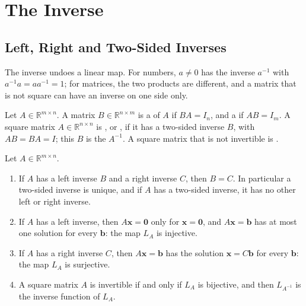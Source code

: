 \section{The Inverse}
\label{sec:inverse}

\subsection{Left, Right and Two-Sided Inverses}

The inverse undoes a linear map. For numbers, $a\ne0$ has the inverse $a^{-1}$ with $a^{-1}a=aa^{-1}=1$; for matrices, the two products are different, and a matrix that is not square can have an inverse on one side only.

\begin{definition}[Inverses]
\label{def:matrix-inverse}
Let $A\in\mathbb R^{m\times n}$. A matrix $B\in\mathbb R^{n\times m}$ is a  of $A$ if $BA=I_n$, and a  if $AB=I_m$. A square matrix $A\in\mathbb R^{n\times n}$ is , or , if it has a two-sided inverse $B$, with $AB=BA=I$; this $B$ is the  $A^{-1}$. A square matrix that is not invertible is .
\end{definition}

\begin{proposition}
\label{prop:one-sided-inverses}
Let $A\in\mathbb R^{m\times n}$.
\begin{enumerate}
\item If $A$ has a left inverse $B$ and a right inverse $C$, then $B=C$. In particular a two-sided inverse is unique, and if $A$ has a two-sided inverse, it has no other left or right inverse.
\item If $A$ has a left inverse, then $A\mathbf x=\mathbf 0$ only for $\mathbf x=\mathbf 0$, and $A\mathbf x=\mathbf b$ has at most one solution for every $\mathbf b$: the map $L_A$ is injective.
\item If $A$ has a right inverse $C$, then $A\mathbf x=\mathbf b$ has the solution $\mathbf x=C\mathbf b$ for every $\mathbf b$: the map $L_A$ is surjective.
\item A square matrix $A$ is invertible if and only if $L_A$ is bijective, and then $L_{A^{-1}}$ is the inverse function of $L_A$.
\end{enumerate}
\end{proposition}


